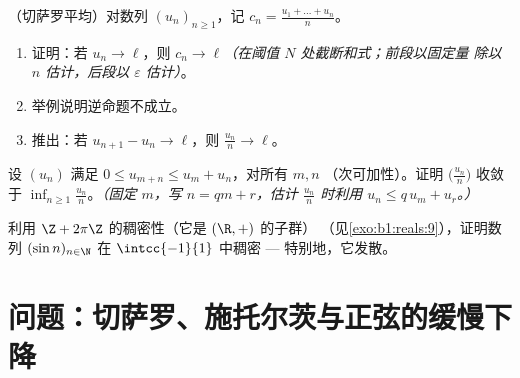 \begin{exercise}[$\star\star\star$]\label{exo:b1:seq:10}
（切萨罗平均）对数列 $(u_n)_{n \geq 1}$，记 $c_n =
\frac{u_1 + \dots + u_n}{n}$。
\begin{enumerate}
  \item 证明：若 $u_n \to \ell$，则 $c_n \to \ell$\emph{（在阈值
        $N$ 处截断和式；前段以固定量
        除以 $n$ 估计，后段以 $\varepsilon$ 估计）}。
  \item 举例说明逆命题不成立。
  \item 推出：若 $u_{n+1} - u_n \to \ell$，则 $\frac{u_n}{n}
        \to \ell$。
\end{enumerate}
\end{exercise}

\begin{exercise}[$\star\star\star$]\label{exo:b1:seq:11}
设 $(u_n)$ 满足 $0 \leq u_{m+n} \leq u_m + u_n$，对所有 $m, n$
（次可加性）。证明 $\bigl(\frac{u_n}{n}\bigr)$ 收敛于
$\inf_{n \geq 1} \frac{u_n}{n}$。\emph{（固定 $m$，写 $n = qm
+ r$，估计 $\frac{u_n}{n}$ 时利用 $u_n \leq q\,u_m + u_r$。）}
\end{exercise}

\begin{exercise}[$\star\star\star$]\label{exo:b1:seq:12}
利用 $\Z + 2\pi\Z$ 的稠密性（它是 $(\R, +)$ 的子群）
（见\cref{exo:b1:reals:9}），证明数列 $(\sin n)_{n \in
\N}$ 在 $\intcc{-1}{1}$ 中稠密 --- 特别地，它发散。
\end{exercise}

\section{问题：切萨罗、施托尔茨与正弦的缓慢下降}

